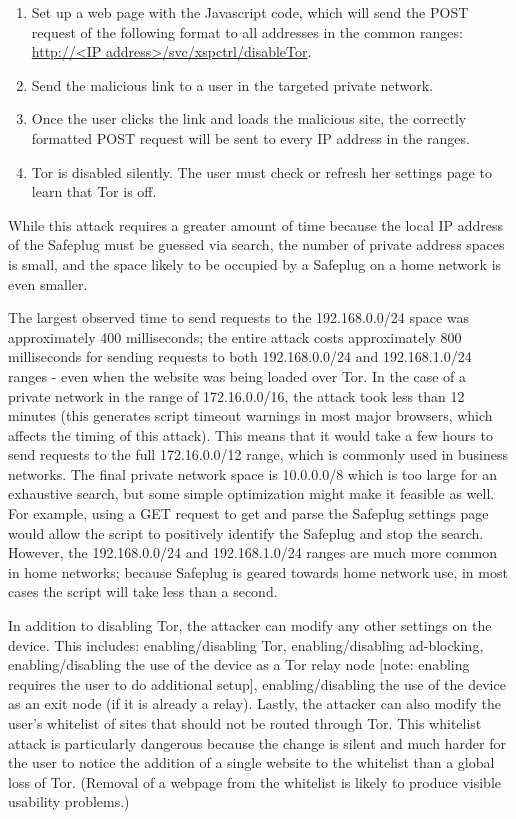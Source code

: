 \documentclass[letterpaper,twocolumn,10pt]{article}
\begin{document}
\begin{enumerate}
\item Set up a web page with the Javascript code, which will send the POST request of the following format to all addresses in the common ranges: \url{http://<IP address>/svc/xspctrl/disableTor}.
\item Send the malicious link to a user in the targeted private network.
\item Once the user clicks the link and loads the malicious site, the correctly formatted POST request will be sent to every IP address in the ranges.  
\item Tor is disabled silently.  The user must check or refresh her settings page to learn that Tor is off.  
\end{enumerate}  

While this attack requires a greater amount of time because the local IP address of the Safeplug must be guessed via search, the number of private address spaces is small, and the space likely to be occupied by a Safeplug on a home network is even smaller.  

The largest observed time to send requests to the 192.168.0.0/24 space was approximately 400 milliseconds; the entire attack costs approximately 800 milliseconds for sending requests to both 192.168.0.0/24 and 192.168.1.0/24 ranges - even when the website was being loaded over Tor.  In the case of a private network in the range of 172.16.0.0/16, the attack took less than 12 minutes (this generates script timeout warnings in most major browsers, which affects the timing of this attack).  This means that it would take a few hours to send requests to the full 172.16.0.0/12 range, which is commonly used in business networks.  The final private network space is 10.0.0.0/8 which is too large for an exhaustive search, but some simple optimization might make it feasible as well.  For example, using a GET request to get and parse the Safeplug settings page would allow the script to positively identify the Safeplug and stop the search.  However, the 192.168.0.0/24 and 192.168.1.0/24 ranges are much more common in home networks; because Safeplug is geared towards home network use, in most cases the script will take less than a second.

In addition to disabling Tor, the attacker can modify any other settings on the device.  This includes: enabling/disabling Tor, enabling/disabling ad-blocking, enabling/disabling the use of the device as a Tor relay node [note: enabling requires the user to do additional setup], enabling/disabling the use of the device as an exit node (if it is already a relay).  Lastly, the attacker can also modify the user's whitelist of sites that should not be routed through Tor.  This whitelist attack is particularly dangerous because the change is silent and much harder for the user to notice the addition of a single website to the whitelist than a global loss of Tor.  (Removal of a webpage from the whitelist is likely to produce visible usability problems.)
\end{document}
